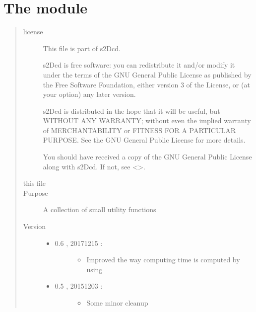 \documentclass[letterpaper,10pt,english]{sphinxmanual}
\begin{document}
\section{The  module}
\label{\detokenize{appendices:module-s2Dcd.utili}}\label{\detokenize{appendices:the-s2dcd-utili-module}}\begin{quote}\begin{description}
\item[{license}] \leavevmode
This file is part of s2Dcd.

s2Dcd is free software: you can redistribute it and/or modify
it under the terms of the GNU General Public License as published by
the Free Software Foundation, either version 3 of the License, or
(at your option) any later version.

s2Dcd is distributed in the hope that it will be useful,
but WITHOUT ANY WARRANTY; without even the implied warranty of
MERCHANTABILITY or FITNESS FOR A PARTICULAR PURPOSE.  See the
GNU General Public License for more details.

You should have received a copy of the GNU General Public License
along with s2Dcd.  If not, see \textless{}\textgreater{}.

\item[{this file}] \leavevmode
{}

\item[{Purpose}] \leavevmode
A collection of small utility functions

\item[{Version}] \leavevmode\begin{itemize}
\item {} \begin{description}
\item[{0.6 , 2017\sphinxhyphen{}12\sphinxhyphen{}15 :}] \leavevmode\begin{itemize}
\item {} 
Improved the way computing time is computed by using

\end{itemize}

\end{description}

\item {} \begin{description}
\item[{0.5 , 2015\sphinxhyphen{}12\sphinxhyphen{}03 :}] \leavevmode\begin{itemize}
\item {} 
Some minor cleanup


\end{itemize}
\end{description}
\end{itemize}
\end{description}
\end{quote}
\end{document}
